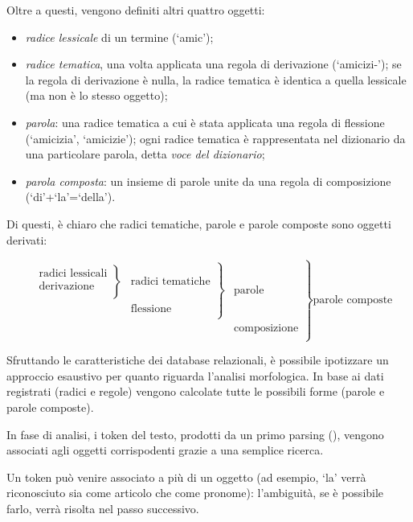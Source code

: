 \documentclass[twoside,stylearticle,11pt,filologia,it,article,bibsection]{spinoza}
\newcommand\spzradless[1]{#1\hspace{.2mm}{\scriptsize $\vdash$}}
\newcommand\spzradtema[1]{#1-}
\newenvironment{lingmeq}{\begin{lingeq}\[}{\]\end{lingeq}}
\begin{document}
Oltre a questi, vengono definiti altri quattro oggetti:
\begin{itemize}
\item {\it radice lessicale} di un termine (`\spzradless{amic}');
\item {\it radice tematica}, una volta applicata una regola di
  derivazione (`\spzradtema{amicizi}'); se la regola di derivazione è
  nulla, la radice tematica è identica a quella lessicale (ma non è lo
  stesso oggetto);
\item {\it parola}: una radice tematica a cui è stata applicata una
  regola di flessione (`amicizia', `amicizie'); ogni radice
  tematica è rappresentata nel dizionario da una particolare parola,
  detta {\it voce del dizionario};
\item {\it parola composta}: un insieme di parole unite da una regola
  di composizione (`di'+`la'=`della').
\end{itemize}

Di questi, è chiaro che radici tematiche, parole e parole composte
sono oggetti derivati:
\begin{lingmeq}
\left.\begin{array}{rr}
\left.\begin{array}{rr}
  \left.\begin{array}{r}  \text{radici lessicali} \\\text{derivazione} \\ \end{array}\right\}
  &\text{radici tematiche} \\
  &\text{flessione} \\
\end{array}\right\} &\text{parole}\\
&\text{composizione}\\
\end{array}\right\} \text{parole composte}
\end{lingmeq}

Sfruttando le caratteristiche dei database relazionali, è possibile
ipotizzare un approccio esaustivo per quanto riguarda l'analisi
morfologica. In base ai dati registrati (radici e regole) vengono
calcolate tutte le possibili forme (parole e parole composte). 

In fase di analisi, i token del testo, prodotti da un primo parsing
(\vedi {}), vengono associati agli oggetti
corrispodenti grazie a una semplice ricerca.

Un token può venire associato a più di un oggetto (ad esempio, `la'
verrà riconosciuto sia come articolo che come pronome): l'ambiguità,
se è possibile farlo, verrà risolta nel passo successivo.
\end{document}
